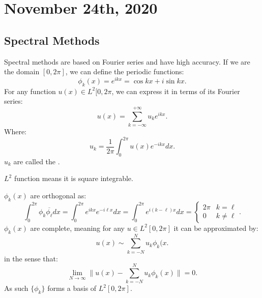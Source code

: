 \documentclass[../main/main.tex]{subfiles}
\begin{document}
\section{November 24th, 2020}
\subsection{Spectral Methods}
Spectral methods are based on Fourier series and have high accuracy. If we are the domain $[0,2\pi]$, we can define the periodic functions:  \[
    \phi_k(x) = e^{ikx} = \cos kx + i \sin kx
.\] For any function $u(x)\in L^2[0,2\pi$, we can express it in terms of its Fourier series: \[
u(x) = \sum_{k=-\infty}^{+\infty} u_k e^{ikx}
.\] Where: \[
u_k = \frac{1}{2\pi}\int_0^{2\pi} u(x) e ^{-ikx}dx
.\] $u_k$ are called the .

\begin{remark}
    $L^2$ function means it is square integrable.
\end{remark}
    $\phi_k(x)$ are orthogonal as:  \[
        \int_0^{2\pi}\phi_k \overline{\phi_\ell} dx = \int_0^{2\pi} e^{ikx}e^{-i\ell x}dx = \int ^{2\pi}_0 e^{i(k-\ell) x}dx = \begin{cases}
            2\pi & k = \ell \\
            0 & k \neq \ell
        \end{cases}
    .\] 
    $\phi_k(x)$ are complete, meaning for any  $u\in L^2[0,2\pi]$ it can be approximated by: \[
        u(x)\sim \sum_{k=-N}^{N} u_k \phi_k(x
    .\] in the sense that: \[
    \lim_{N\to \infty} \|u(x) - \sum_{k=-N}^{N} u_k \phi_k(x)\| = 0
    .\] 
    As such $\{\phi_k\} $ forms a basis of $L^2[0,2\pi]$.
\end{document}
